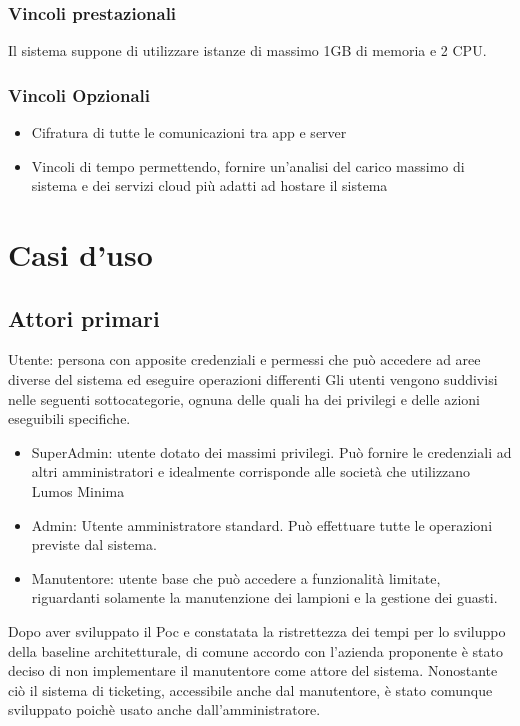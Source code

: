 \documentclass[12pt]{article}
\begin{document}
\subsubsection{Vincoli prestazionali}
Il sistema suppone di utilizzare istanze di massimo 1GB di memoria e 2 CPU.

\subsubsection{Vincoli Opzionali}
\begin{itemize}
	\item Cifratura di tutte le comunicazioni tra app e server
	\item Vincoli di tempo permettendo, fornire un'analisi del carico massimo di sistema e dei servizi cloud più adatti ad hostare il sistema
\end{itemize}


\section{Casi d'uso}

\subsection{Attori primari}
Utente: persona con apposite credenziali e permessi che può accedere ad aree diverse del sistema ed eseguire operazioni differenti
Gli utenti vengono suddivisi nelle seguenti sottocategorie, ognuna delle quali ha dei privilegi e delle azioni eseguibili specifiche.
\begin{itemize}
	\item SuperAdmin: utente dotato dei massimi privilegi. Può fornire le credenziali ad altri amministratori e idealmente corrisponde alle società che utilizzano Lumos Minima
	\item Admin: Utente amministratore standard. Può effettuare tutte le operazioni previste dal sistema.
	\item Manutentore: utente base che può accedere a funzionalità limitate, riguardanti solamente la manutenzione dei lampioni e la gestione dei guasti.
\end{itemize}
Dopo aver sviluppato il Poc e constatata la ristrettezza dei tempi per lo sviluppo della baseline architetturale, di comune accordo con l'azienda proponente è stato deciso di non implementare il manutentore come attore del sistema. Nonostante ciò il sistema di ticketing, accessibile anche dal manutentore, è stato comunque sviluppato poichè usato anche dall'amministratore.
\\
\end{document}
